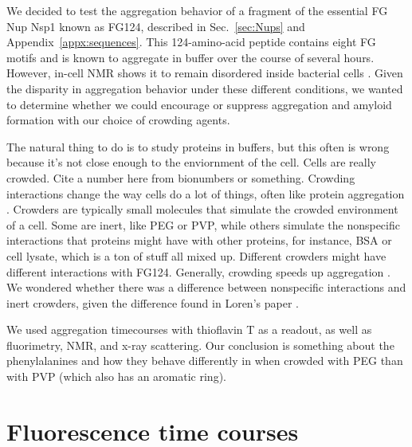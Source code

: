 We decided to test the aggregation behavior of a fragment of the essential FG Nup Nsp1 known as FG124, described in Sec.~\ref{sec:Nups} and Appendix~\ref{appx:sequences}.  This 124-amino-acid peptide contains eight FG motifs and is known to aggregate in buffer over the course of several hours.  However, in-cell NMR shows it to remain disordered inside bacterial cells \cite{hough15}.  Given the disparity in aggregation behavior under these different conditions, we wanted to determine whether we could encourage or suppress aggregation and amyloid formation with our choice of crowding agents.



The natural thing to do is to study proteins in buffers, but this often is wrong because it's not close enough to the enviornment of the cell.  Cells are really crowded.  Cite a number here from bionumbers or something.  Crowding interactions change the way cells do a lot of things, often like protein aggregation \cite{something}.  Crowders are typically small molecules that simulate the crowded environment of a cell. Some are inert, like PEG or PVP, while others simulate the nonspecific interactions that proteins might have with other proteins, for instance, BSA or cell lysate, which is a ton of stuff all mixed up.  Different crowders might have different interactions with FG124.  Generally, crowding speeds up aggregation \cite{milles13, other things}.  We wondered whether there was a difference between nonspecific interactions and inert crowders, given the difference found in Loren's paper \cite{hough15}.

We used aggregation timecourses with thioflavin T as a readout, as well as fluorimetry, NMR, and x-ray scattering.  Our conclusion is something about the phenylalanines and how they behave differently in when crowded with PEG than with PVP (which also has an aromatic ring).

\section{Fluorescence time courses}

